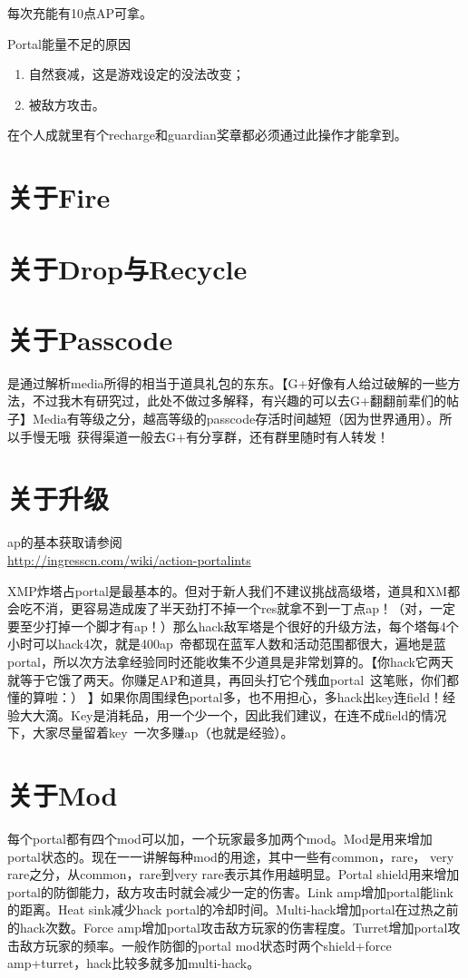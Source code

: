 \documentclass[a4paper]{article}
\begin{document}
每次充能有10点AP可拿。\par
Portal能量不足的原因
\begin{enumerate}
\item 自然衰减，这是游戏设定的没法改变；
\item 被敌方攻击。

\end{enumerate}

在个人成就里有个recharge和guardian奖章都必须通过此操作才能拿到。

\section{关于Fire}

\section{关于Drop与Recycle}

\section{关于Passcode}
是通过解析media所得的相当于道具礼包的东东。【G+好像有人给过破解的一些方法，不过我木有研究过，此处不做过多解释，有兴趣的可以去G+翻翻前辈们的帖子】Media有等级之分，越高等级的passcode存活时间越短（因为世界通用）。所以手慢无哦~获得渠道一般去G+有分享群，还有群里随时有人转发！

\section{关于升级}
ap的基本获取请参阅\\
\url{http://ingresscn.com/wiki/action-portalints}\par
XMP炸塔占portal是最基本的。但对于新人我们不建议挑战高级塔，道具和XM都会吃不消，更容易造成废了半天劲打不掉一个res就拿不到一丁点ap！（对，一定要至少打掉一个脚才有ap！）那么hack敌军塔是个很好的升级方法，每个塔每4个小时可以hack4次，就是400ap~帝都现在蓝军人数和活动范围都很大，遍地是蓝portal，所以次方法拿经验同时还能收集不少道具是非常划算的。【你hack它两天就等于它饿了两天。你赚足AP和道具，再回头打它个残血portal~这笔账，你们都懂的算啦：） 】如果你周围绿色portal多，也不用担心，多hack出key连field！经验大大滴。Key是消耗品，用一个少一个，因此我们建议，在连不成field的情况下，大家尽量留着key~一次多赚ap（也就是经验）。

\section{关于Mod}
每个portal都有四个mod可以加，一个玩家最多加两个mod。Mod是用来增加portal状态的。现在一一讲解每种mod的用途，其中一些有common，rare， very rare之分，从common，rare到very rare表示其作用越明显。Portal shield用来增加portal的防御能力，敌方攻击时就会减少一定的伤害。Link amp增加portal能link的距离。Heat sink减少hack portal的冷却时间。Multi-hack增加portal在过热之前的hack次数。Force amp增加portal攻击敌方玩家的伤害程度。Turret增加portal攻击敌方玩家的频率。一般作防御的portal mod状态时两个shield+force amp+turret，hack比较多就多加multi-hack。
\end{document}
